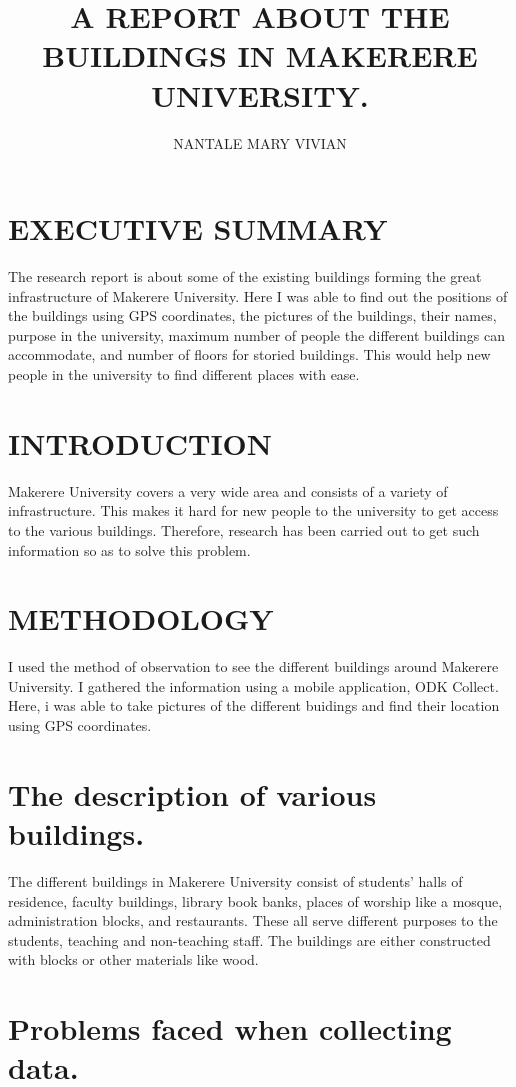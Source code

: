 \documentclass{article}
\begin{document}
\title{A REPORT ABOUT THE BUILDINGS IN MAKERERE UNIVERSITY.}
\author{NANTALE MARY VIVIAN }
\maketitle
\tableofcontents
\section{EXECUTIVE SUMMARY }{The research report is about some of the existing buildings forming the great infrastructure of Makerere University. Here I was able to find out the positions of the buildings using GPS coordinates, the pictures of the buildings, their names, purpose in the university, maximum number of people the different buildings can accommodate, and number of floors for storied buildings. This would help new people in the university to find different places with ease.
\section{INTRODUCTION}{ Makerere University covers a very wide area and consists of a variety of infrastructure. This makes it hard for new people to the university to get access to the various buildings. Therefore, research has been carried out to get such information so as to solve this problem.}
 
\section{METHODOLOGY}{I used the method of observation to see the different buildings around Makerere University. I gathered the information using a mobile application, ODK Collect. Here, i was able to take pictures of the different buidings and find their location using GPS coordinates.}

\section{The description of various buildings. }{The different buildings in Makerere University consist of students’ halls of residence, faculty buildings, library book banks, places of worship like a mosque, administration blocks, and restaurants. These all serve different purposes to the students, teaching and non-teaching staff. The buildings are either constructed with blocks or other materials like wood.}

\section{Problems faced when collecting data. }{\itemize

}}
\end{document}
